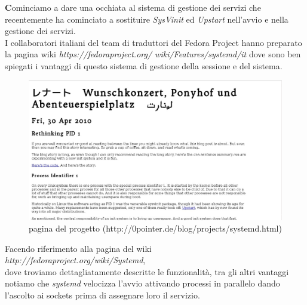 \onehalfspacing
\lettrine[lines=1, loversize=0.1, lraise=0.1]{\color[cmyk]{0.5, 0, 1, 0}\bfseries C}{}ominciamo a dare una occhiata al sistema di gestione dei servizi che recentemente ha cominciato a sostituire {\itshape SysVinit} ed {\itshape Upstart} nell'avvio e nella gestione dei servizi.\\

I collaboratori italiani del team di traduttori del Fedora Project hanno preparato la pagina wiki {\itshape https://fedoraproject.org/ wiki/Features/systemd/it} dove sono ben spiegati i vantaggi di questo sistema di gestione della sessione e del sistema.\\

\begin{figure}[!htbp]
\centering
\includegraphics[scale=.45]{articoli/sistema_base/immagini/home_systemd.jpeg}
\caption{pagina del progetto ({\scriptsize http://0pointer.de/blog/projects/systemd.html})}
\end{figure}

Facendo riferimento alla pagina del wiki\\{\itshape http://fedoraproject.org/wiki/Systemd},\\ dove troviamo dettagliatamente descritte le funzionalità, tra gli altri vantaggi notiamo che {\itshape systemd} velocizza l'avvio attivando processi in parallelo dando l'ascolto ai sockets prima di assegnare loro il servizio.\\

